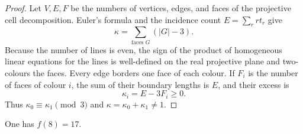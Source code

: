 \begin{proof}
Let $V,E,F$ be the numbers of vertices, edges, and faces of the projective
cell decomposition.  Euler's formula and the incidence count
$E=\sum_r r t_r$ give
\[
 \kappa=\sum_{\text{faces }G}(|G|-3).
\]
Because the number of lines is even, the sign of the product of homogeneous
linear equations for the lines is well-defined on the real projective plane
and two-colours the faces.  Every edge borders one face of each colour.
If $F_i$ is the number of faces of colour $i$, the sum of their boundary
lengths is $E$, and their excess is
\[
 \kappa_i=E-3F_i\geq0.
\]
Thus $\kappa_0\equiv\kappa_1\pmod3$ and
$\kappa=\kappa_0+\kappa_1\neq1$.
\end{proof}

\begin{proposition}\label{prop:n8}
One has $f(8)=17$.
\end{proposition}

